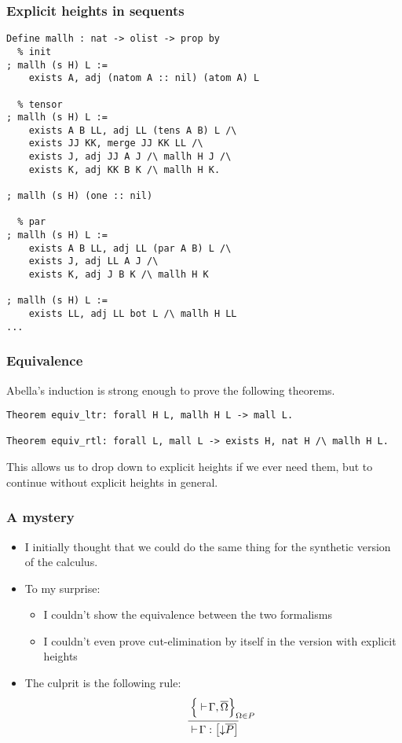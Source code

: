 \documentclass{beamer}
\begin{document}
\begin{frame}[fragile]
  \frametitle{Explicit heights in sequents}

  \smaller[2]

\begin{lstlisting}[emph={s,H},emphstyle={\color{red}}]
Define mallh : nat -> olist -> prop by
  % init
; mallh (s H) L :=
    exists A, adj (natom A :: nil) (atom A) L

  % tensor
; mallh (s H) L :=
    exists A B LL, adj LL (tens A B) L /\
    exists JJ KK, merge JJ KK LL /\
    exists J, adj JJ A J /\ mallh H J /\
    exists K, adj KK B K /\ mallh H K.

; mallh (s H) (one :: nil)

  % par
; mallh (s H) L :=
    exists A B LL, adj LL (par A B) L /\
    exists J, adj LL A J /\
    exists K, adj J B K /\ mallh H K

; mallh (s H) L :=
    exists LL, adj LL bot L /\ mallh H LL
...
\end{lstlisting}

\end{frame}

\begin{frame}[fragile]
  \frametitle{Equivalence}

  Abella's induction is strong enough to prove the following theorems.

  {\smaller[2]
\begin{lstlisting}
Theorem equiv_ltr: forall H L, mallh H L -> mall L.

Theorem equiv_rtl: forall L, mall L -> exists H, nat H /\ mallh H L.
\end{lstlisting}}

   \bigskip \pause

   This allows us to drop down to explicit heights if we ever need
   them, but to continue without explicit heights in general.
\end{frame}

\begin{frame}
  \frametitle{A mystery}

  \begin{itemize}
  \item I initially thought that we could do the same thing for the
    synthetic version of the calculus.
  \item To my surprise:
    \begin{itemize}
    \item I couldn't show the equivalence between the two formalisms
    \item I couldn't even prove cut-elimination by itself in the
      version with explicit heights
    \end{itemize}
  \item The culprit is the following rule:
    \begin{gather*}
      \infer{
        \ts \G : \foc{\SHP \dual P}
      }{
        \Bigl\{{
          \ts \G, \dual \W
        }\Bigr\}_{\mathrlap{\W \in P}}
      }
    \end{gather*}
  \end{itemize}
\end{frame}
\end{document}
